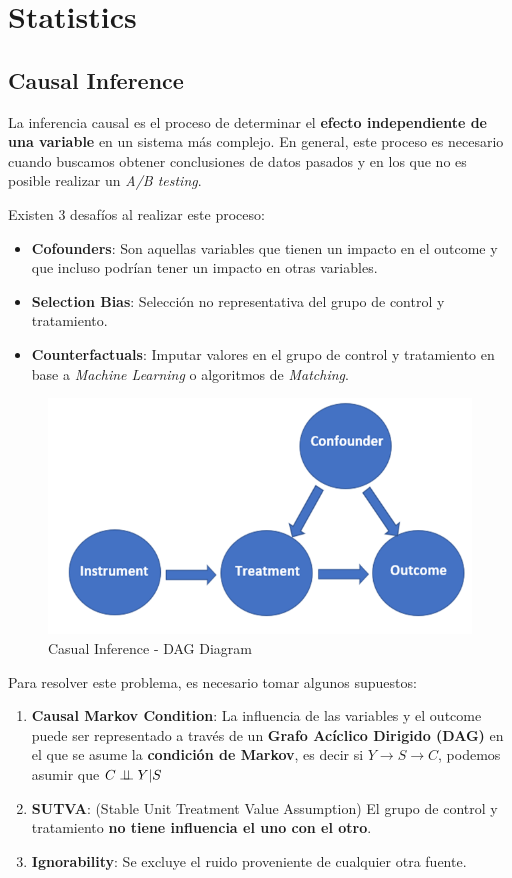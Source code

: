 \section{Statistics}

\subsection{Causal Inference}

La inferencia causal es el proceso de determinar el \textbf{efecto independiente de una variable} en un sistema más complejo. En general, este proceso es necesario cuando buscamos obtener conclusiones de datos pasados y en los que no es posible realizar un \textit{A/B testing}.

Existen 3 desafíos al realizar este proceso: 
\begin{itemize}
    \item \textbf{Cofounders}: Son aquellas variables que tienen un impacto en el outcome y que incluso podrían tener un impacto en otras variables. 
    \item \textbf{Selection Bias}: Selección no representativa del grupo de control y tratamiento.
    \item \textbf{Counterfactuals}: Imputar valores en el grupo de control y tratamiento en base a \textit{Machine Learning} o algoritmos de \textit{Matching}. 
\end{itemize}

\begin{figure}[H]
    \center
    \includegraphics[scale=0.3]{notebooks/STATS/img/causal_inference_diagram.png}
    \caption{Casual Inference - DAG Diagram}
\end{figure}

Para resolver este problema, es necesario tomar algunos supuestos: 
\begin{enumerate}
    \item \textbf{Causal Markov Condition}: La influencia de las variables y el outcome puede ser representado a través de un \textbf{Grafo Acíclico Dirigido (DAG)} en el que se asume la \textbf{condición de Markov}, es decir si $Y \rightarrow S \rightarrow C$, podemos asumir que $C \perp \!\!\! \perp Y | S$
    \item \textbf{SUTVA}: (Stable Unit Treatment Value Assumption) El grupo de control y tratamiento \textbf{no tiene influencia el uno con el otro}. 
    \item \textbf{Ignorability}: Se excluye el ruido proveniente de cualquier otra fuente. 
\end{enumerate}

